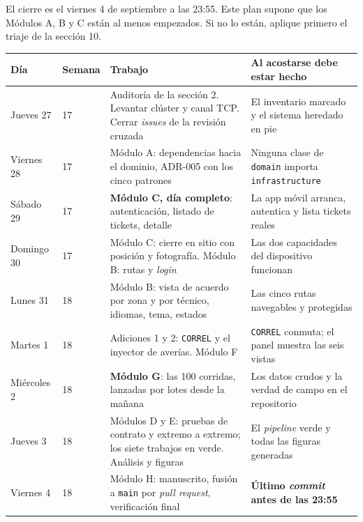 \documentclass[11pt,a4paper]{article}
\begin{document}
El cierre es el viernes 4 de septiembre a las 23:55. Este plan supone que los Módulos A, B y C están al menos empezados. Si no lo están, aplique primero el triaje de la sección 10.

\begin{center}
	\small
	\begin{longtable}{@{}p{2.6cm}p{1.5cm}p{5.2cm}p{5.0cm}@{}}
		\toprule
		\textbf{Día} & \textbf{Semana} & \textbf{Trabajo} & \textbf{Al acostarse debe estar hecho} \\
		\midrule
		\endhead
		Jueves 27 & 17 & Auditoría de la sección 2. Levantar clúster y canal TCP. Cerrar \emph{issues} de la revisión cruzada & El inventario marcado y el sistema heredado en pie \\
		\addlinespace
		Viernes 28 & 17 & Módulo A: dependencias hacia el dominio, ADR-005 con los cinco patrones & Ninguna clase de \texttt{domain} importa \texttt{infrastructure} \\
		\addlinespace
		Sábado 29 & 17 & \textbf{Módulo C, día completo}: autenticación, listado de tickets, detalle & La app móvil arranca, autentica y lista tickets reales \\
		\addlinespace
		Domingo 30 & 17 & Módulo C: cierre en sitio con posición y fotografía. Módulo B: rutas y \emph{login} & Las dos capacidades del dispositivo funcionan \\
		\addlinespace
		Lunes 31 & 18 & Módulo B: vista de acuerdo por zona y por técnico, idiomas, tema, estados & Las cinco rutas navegables y protegidas \\
		\addlinespace
		Martes 1 & 18 & Adiciones 1 y 2: \texttt{CORREL} y el inyector de averías. Módulo F & \texttt{CORREL} conmuta; el panel muestra las seis vistas \\
		\addlinespace
		Miércoles 2 & 18 & \textbf{Módulo G}: las 100 corridas, lanzadas por lotes desde la mañana & Los datos crudos y la verdad de campo en el repositorio \\
		\addlinespace
		Jueves 3 & 18 & Módulos D y E: pruebas de contrato y extremo a extremo; los siete trabajos en verde. Análisis y figuras & El \emph{pipeline} verde y todas las figuras generadas \\
		\addlinespace
		Viernes 4 & 18 & Módulo H: manuscrito, fusión a \texttt{main} por \emph{pull request}, verificación final & \textbf{Último \emph{commit} antes de las 23:55} \\
		\bottomrule
	\end{longtable}
\end{center}
\end{document}
